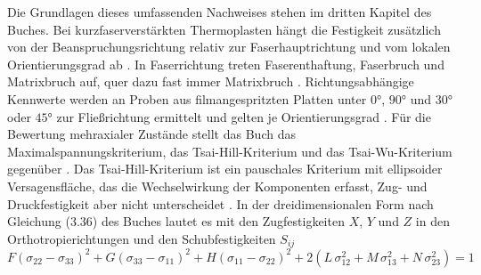 
Die Grundlagen dieses umfassenden Nachweises stehen im dritten Kapitel des Buches. Bei kurzfaserverstärkten Thermoplasten hängt die Festigkeit zusätzlich von der Beanspruchungsrichtung relativ zur Faserhauptrichtung und vom lokalen Orientierungsgrad ab \cite[S.~219]{Sto18}. In Faserrichtung treten Faserenthaftung, Faserbruch und Matrixbruch auf, quer dazu fast immer Matrixbruch \cite[S.~221]{Sto18}. Richtungsabhängige Kennwerte werden an Proben aus filmangespritzten Platten unter $0$°, $90$° und $30$° oder $45$° zur Fließrichtung ermittelt und gelten je Orientierungsgrad \cite[S.~226 bis 227]{Sto18}. Für die Bewertung mehraxialer Zustände stellt das Buch das Maximalspannungskriterium, das Tsai-Hill-Kriterium und das Tsai-Wu-Kriterium gegenüber \cite[S.~229 bis 234]{Sto18}. Das Tsai-Hill-Kriterium ist ein pauschales Kriterium mit ellipsoider Versagensfläche, das die Wechselwirkung der Komponenten erfasst, Zug- und Druckfestigkeit aber nicht unterscheidet \cite[S.~231 bis 232]{Sto18}. In der dreidimensionalen Form nach Gleichung (3.36) des Buches lautet es mit den Zugfestigkeiten $X$, $Y$ und $Z$ in den Orthotropierichtungen und den Schubfestigkeiten $S_{ij}$ \cite[S.~233]{Sto18}
\begin{equation}
    F\left(\sigma_{22} - \sigma_{33}\right)^{2} + G\left(\sigma_{33} - \sigma_{11}\right)^{2} + H\left(\sigma_{11} - \sigma_{22}\right)^{2} + 2\left(L\,\sigma_{12}^{2} + M\,\sigma_{13}^{2} + N\,\sigma_{23}^{2}\right) = 1
    \label{eq:tsai_hill}
\end{equation}
